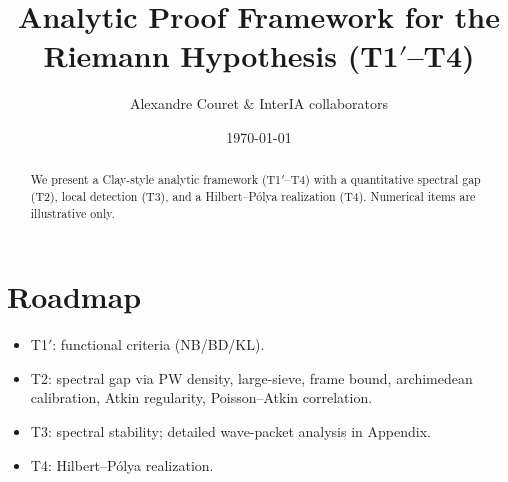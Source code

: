 \documentclass[11pt]{article}
\title{Analytic Proof Framework for the Riemann Hypothesis (T1$′$--T4)}
\author{Alexandre Couret \& InterIA collaborators}
\date{\today}
\begin{document}
\maketitle
\begin{abstract}
We present a Clay-style analytic framework (T1$′$--T4) with a quantitative spectral gap (T2),
local detection (T3), and a Hilbert--P\'olya realization (T4). Numerical items are illustrative only.
\end{abstract}
\section*{Roadmap}
\begin{itemize}
\item T1$′$: functional criteria (NB/BD/KL).
\item T2: spectral gap via PW density, large-sieve, frame bound, archimedean calibration, Atkin regularity, Poisson--Atkin correlation.
\item T3: spectral stability; detailed wave-packet analysis in Appendix.
\item T4: Hilbert--P\'olya realization.
\end{itemize}




\appendix



\end{document}
